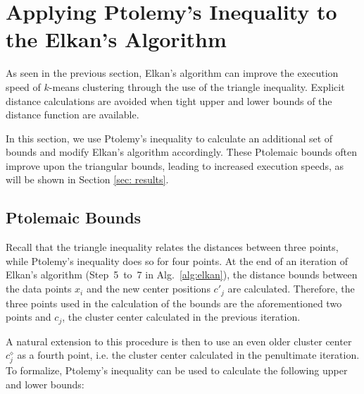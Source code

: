 \newcommand{\prev}{\diamond}

\section{Applying Ptolemy's Inequality to the Elkan's Algorithm}
\label{sec:contrib}

As seen in the previous section,
Elkan's algorithm can improve the execution speed of $k$-means clustering through the use of the triangle inequality.
Explicit distance calculations are avoided when tight upper and lower bounds of the distance function are available.

In this section, we use Ptolemy's inequality to calculate an additional set of bounds and modify Elkan's algorithm accordingly.
These Ptolemaic bounds often improve upon the triangular bounds, leading to increased execution speeds, as will be shown in Section \ref{sec: results}.


\subsection{Ptolemaic Bounds}
Recall that the triangle inequality relates the distances between three points,
while Ptolemy's inequality does so for four points.
At the end of an iteration of Elkan's algorithm (Step~5~to~7 in Alg.~\ref{alg:elkan}),
the distance bounds between the data points $x_i$ and the new center positions $c'_j$ are calculated.
Therefore, the three points used in the calculation of the bounds are the aforementioned two points and $c_j$, the cluster center calculated in the previous iteration.

A natural extension to this procedure is then to use an even older cluster center $c^\prev_j$ as a fourth point,
i.e. the cluster center calculated in the penultimate iteration.
To formalize, Ptolemy's inequality can be used to calculate the following upper and lower bounds:

